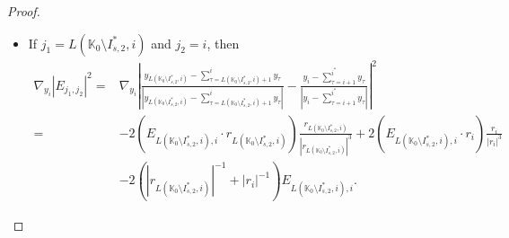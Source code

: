 \documentclass[11pt,reqno]{amsart}
\numberwithin{equation}{section}
\theoremstyle{definition}
\begin{document}
\begin{proof}
\begin{itemize}
		\item If $j_1=L(\mathbb{K}_0\setminus I_{\dot{s},2}^*,i)$ and $j_2=i$, then
		\begin{equation*}
			\begin{split}
				\nabla_{y_i}\left|E_{j_1,j_2}\right|^2=&\nabla_{y_i}\left|\frac{y_{L(\mathbb{K}_0\setminus I_{\dot{s},2}^*,i)}-\mbox{$\sum_{\tau=L(\mathbb{K}_0\setminus I_{\dot{s},2}^*,i)+1}^{i}y_\tau$}}{|y_{L(\mathbb{K}_0\setminus I_{\dot{s},2}^*,i)}-\mbox{$\sum_{\tau=L(\mathbb{K}_0\setminus I_{\dot{s},2}^*,i)+1}^{i}y_\tau$}|}-\frac{\mbox{$y_i-\sum_{\tau=i+1}^{i^*}y_\tau$}}{|\mbox{$y_i-\sum_{\tau=i+1}^{i^*}y_\tau$}|}\right|^2\\
				=&-2\left(E_{L(\mathbb{K}_0\setminus I_{\dot{s},2}^*,i),i}\cdot r_{L(\mathbb{K}_0\setminus I_{\dot{s},2}^*,i)}\right)\frac{r_{L(\mathbb{K}_0\setminus I_{\dot{s},2}^*,i)}}{|r_{L(\mathbb{K}_0\setminus I_{\dot{s},2}^*,i)}|^3}+2\left(E_{L(\mathbb{K}_0\setminus I_{\dot{s},2}^*,i),i}\cdot r_i\right)\frac{r_i}{|r_i|^3}\\
				&-2\left(|r_{L(\mathbb{K}_0\setminus I_{\dot{s},2}^*,i)}|^{-1}+|r_i|^{-1}\right)E_{L(\mathbb{K}_0\setminus I_{\dot{s},2}^*,i),i}.
			\end{split}
		\end{equation*}
		

\end{itemize}
\end{proof}
\end{document}
